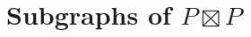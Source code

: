 \documentclass[10pt, conference, compsocconf]{IEEEtran}
\newcommand{\Oh}{\mathcal{O}}
\let\leq\leqslant
\begin{document}









\section{Subgraphs of $P\boxtimes P$}
\end{document}

